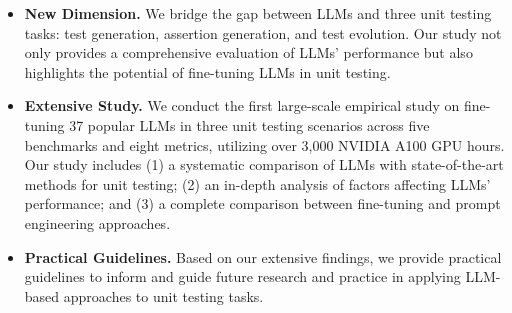 \begin{itemize}[leftmargin=1em]
    \item \textbf{New Dimension.} 
    We bridge the gap between LLMs and three unit testing tasks: test generation, assertion generation, and test evolution. 
    Our study not only provides a comprehensive evaluation of LLMs' performance but also highlights the potential of fine-tuning LLMs in unit testing.

    \item \textbf{Extensive Study.}
    We conduct the first large-scale empirical study on fine-tuning 37 popular LLMs in three unit testing scenarios across five benchmarks and eight metrics, utilizing over 3,000 NVIDIA A100 GPU hours.
    Our study includes (1) a systematic comparison of LLMs with state-of-the-art methods for unit testing;
    (2) an in-depth analysis of factors affecting LLMs' performance;
    and (3) a complete comparison between fine-tuning and prompt engineering approaches.

    \item \textbf{Practical Guidelines.}
    Based on our extensive findings, we provide practical guidelines to inform and guide future research and practice in applying LLM-based approaches to unit testing tasks.
\end{itemize}

